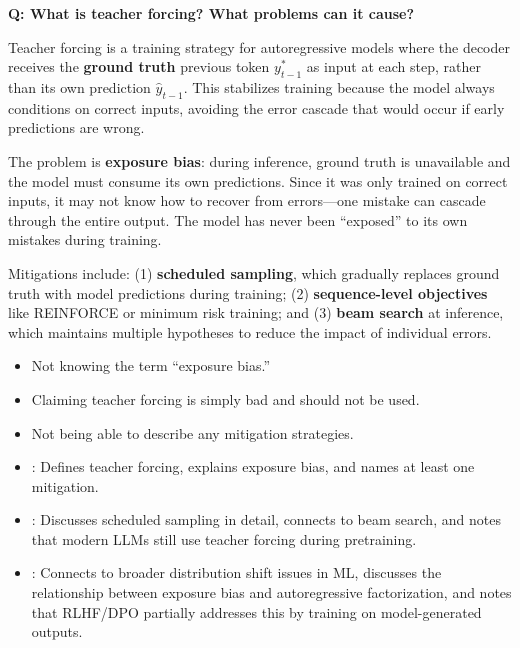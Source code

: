 \begin{interviewq}
\textbf{Q: What is teacher forcing? What problems can it cause?}

 \quad {} \quad
\badgefreq{\freqmed}

\stronganswer
Teacher forcing is a training strategy for autoregressive models where
the decoder receives the \textbf{ground truth} previous token $y_{t-1}^*$
as input at each step, rather than its own prediction $\hat{y}_{t-1}$.
This stabilizes training because the model always conditions on correct
inputs, avoiding the error cascade that would occur if early predictions
are wrong.

The problem is \textbf{exposure bias}: during inference, ground truth is
unavailable and the model must consume its own predictions.  Since it was
only trained on correct inputs, it may not know how to recover from
errors---one mistake can cascade through the entire output.  The model
has never been ``exposed'' to its own mistakes during training.

Mitigations include: (1) \textbf{scheduled sampling}, which gradually
replaces ground truth with model predictions during training;
(2) \textbf{sequence-level objectives} like REINFORCE or minimum risk
training; and (3) \textbf{beam search} at inference, which maintains
multiple hypotheses to reduce the impact of individual errors.

\redflags
\begin{itemize}
\item Not knowing the term ``exposure bias.''
\item Claiming teacher forcing is simply bad and should not be used.
\item Not being able to describe any mitigation strategies.
\end{itemize}


\goodgreat
\begin{itemize}
\item {}: Defines teacher forcing, explains exposure bias,
  and names at least one mitigation.
\item {}: Discusses scheduled sampling in detail, connects
  to beam search, and notes that modern LLMs still use teacher forcing
  during pretraining.
\item {}: Connects to broader distribution shift issues
  in ML, discusses the relationship between exposure bias and
  autoregressive factorization, and notes that RLHF/DPO partially
  addresses this by training on model-generated outputs.
\end{itemize}

\end{interviewq}

